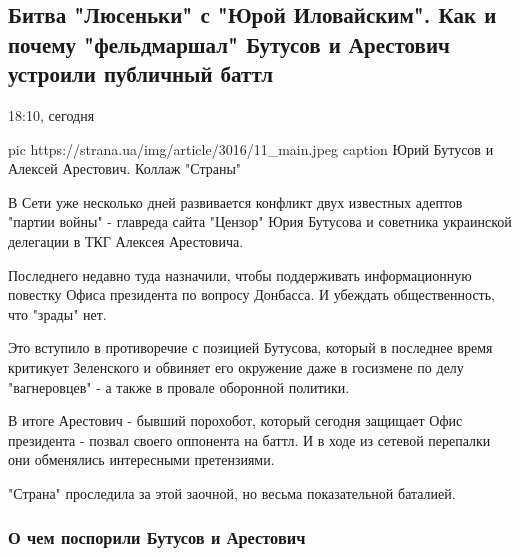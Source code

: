  
 
 


\subsection{Битва "Люсеньки" с "Юрой Иловайским". Как и почему "фельдмаршал" Бутусов и Арестович устроили публичный баттл}

\par 18:10, сегодня

\ifcmt
pic https://strana.ua/img/article/3016/11_main.jpeg
caption Юрий Бутусов и Алексей Арестович. Коллаж "Страны"
\fi

В Сети уже несколько дней развивается конфликт двух известных адептов
"партии войны" - главреда сайта "Цензор" Юрия Бутусова и советника
украинской делегации в ТКГ Алексея Арестовича.

Последнего недавно туда назначили, чтобы поддерживать информационную
повестку Офиса президента по вопросу Донбасса. И убеждать общественность,
что "зрады" нет. 

Это вступило в противоречие с позицией Бутусова, который в последнее время
критикует Зеленского и обвиняет его окружение даже в госизмене по делу
"вагнеровцев" - а также в провале оборонной политики.

В итоге Арестович - бывший порохобот, который сегодня защищает Офис
президента - позвал своего оппонента на баттл. И в ходе из сетевой
перепалки они обменялись интересными претензиями. 

"Страна" проследила за этой заочной, но весьма показательной баталией.

\subsubsection{О чем поспорили Бутусов и Арестович}

